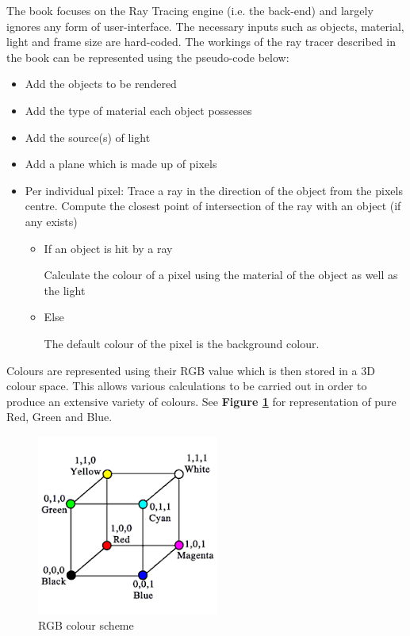 \documentclass[a4paper]{report}
\begin{document}
	\par The book focuses on the Ray Tracing engine (i.e. the back-end) and largely ignores any form of user-interface. The necessary inputs such as objects, material, light and frame size are hard-coded. The workings of the ray tracer described in the book can be represented using the pseudo-code below:\newline
	\begin{itemize}
		\item Add the objects to be rendered
		\item Add the type of material each object possesses
		\item Add the source(s) of light 
		\item Add a plane which is made up of pixels
		\item Per individual pixel:\newline
		Trace a ray in the direction of the object from the pixels centre.\newline
		Compute the closest point of intersection of the ray with an object (if any exists)
		\begin{itemize}
			\item If an object is hit by a ray
			\par Calculate the colour of a pixel using the material of the object as well as the light 
			\item Else
			\par The default colour of the pixel is the background colour\cite{suffern_ray_2007}. 
		\end{itemize}
	\end{itemize} 
	
	\par Colours are represented using their RGB value which is then stored in a 3D colour space. This allows various calculations to be carried out in order to produce an extensive variety of colours. See \textbf{Figure \ref{fig:colour}} for representation of pure Red, Green and Blue.
	
	\begin{figure}[ht!]
		\centering
		\includegraphics[scale=0.60]{./colour.png}
		\caption{RGB colour scheme}
		\label{fig:colour}
	\end{figure}
	
\end{document}
